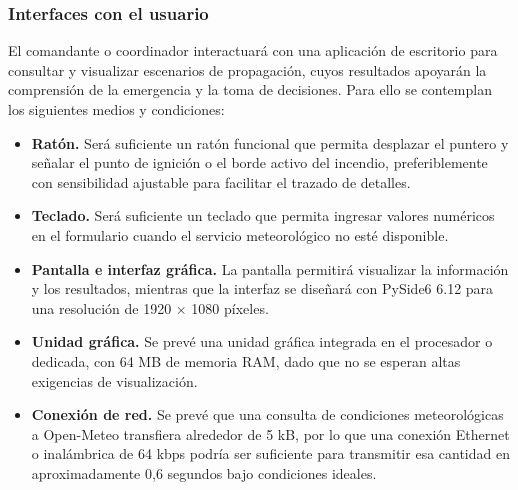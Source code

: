 \subsubsection{Interfaces con el usuario}
{\color{black}
El comandante o coordinador interactuará con una aplicación de escritorio para consultar y visualizar escenarios de propagación, cuyos resultados apoyarán la comprensión de la emergencia y la toma de decisiones. Para ello se contemplan los siguientes medios y condiciones:
\begin{itemize}
\item \textbf{Ratón.} Será suficiente un ratón funcional que permita desplazar el puntero y señalar el punto de ignición o el borde activo del incendio, preferiblemente con sensibilidad ajustable para facilitar el trazado de detalles.
\item \textbf{Teclado.} Será suficiente un teclado que permita ingresar valores numéricos en el formulario cuando el servicio meteorológico no esté disponible.
\item \textbf{Pantalla e interfaz gráfica.} La pantalla permitirá visualizar la información y los resultados, mientras que la interfaz se diseñará con PySide6 6.12 para una resolución de 1920 × 1080 píxeles.
\item \textbf{Unidad gráfica.} Se prevé una unidad gráfica integrada en el procesador o dedicada, con 64 MB de memoria RAM, dado que no se esperan altas exigencias de visualización.
\item \textbf{Conexión de red.} Se prevé que una consulta de condiciones meteorológicas a Open-Meteo transfiera alrededor de 5 kB, por lo que una conexión Ethernet o inalámbrica de 64 kbps podría ser suficiente para transmitir esa cantidad en aproximadamente 0,6 segundos bajo condiciones ideales.
\end{itemize}
}
